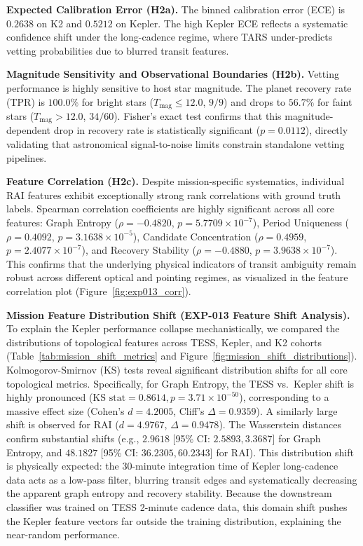 \textbf{Expected Calibration Error (H2a).} The binned calibration error (ECE) is $0.2638$ on K2 and $0.5212$ on Kepler. The high Kepler ECE reflects a systematic confidence shift under the long-cadence regime, where TARS under-predicts vetting probabilities due to blurred transit features.

\textbf{Magnitude Sensitivity and Observational Boundaries (H2b).} Vetting performance is highly sensitive to host star magnitude. The planet recovery rate (TPR) is $100.0\%$ for bright stars ($T_{\text{mag}} \le 12.0$, $9/9$) and drops to $56.7\%$ for faint stars ($T_{\text{mag}} > 12.0$, $34/60$). Fisher's exact test confirms that this magnitude-dependent drop in recovery rate is statistically significant ($p = 0.0112$), directly validating that astronomical signal-to-noise limits constrain standalone vetting pipelines.

\textbf{Feature Correlation (H2c).} Despite mission-specific systematics, individual RAI features exhibit exceptionally strong rank correlations with ground truth labels. Spearman correlation coefficients are highly significant across all core features: Graph Entropy ($\rho = -0.4820$, $p = 5.7709 \times 10^{-7}$), Period Uniqueness ($\rho = 0.4092$, $p = 3.1638 \times 10^{-5}$), Candidate Concentration ($\rho = 0.4959$, $p = 2.4077 \times 10^{-7}$), and Recovery Stability ($\rho = -0.4880$, $p = 3.9638 \times 10^{-7}$). This confirms that the underlying physical indicators of transit ambiguity remain robust across different optical and pointing regimes, as visualized in the feature correlation plot (Figure~\ref{fig:exp013_corr}).

\textbf{Mission Feature Distribution Shift (EXP-013 Feature Shift Analysis).} 
To explain the Kepler performance collapse mechanistically, we compared the distributions of topological features across TESS, Kepler, and K2 cohorts (Table~\ref{tab:mission_shift_metrics} and Figure~\ref{fig:mission_shift_distributions}). Kolmogorov-Smirnov (KS) tests reveal significant distribution shifts for all core topological metrics. Specifically, for Graph Entropy, the TESS vs.~Kepler shift is highly pronounced ($\text{KS stat} = 0.8614, p = 3.71 \times 10^{-50}$), corresponding to a massive effect size (Cohen's $d = 4.2005$, Cliff's $\Delta = 0.9359$). A similarly large shift is observed for RAI ($d = 4.9767$, $\Delta = 0.9478$). The Wasserstein distances confirm substantial shifts (e.g., $2.9618$ [95\% CI: $2.5893, 3.3687$] for Graph Entropy, and $48.1827$ [95\% CI: $36.2305, 60.2343$] for RAI). This distribution shift is physically expected: the 30-minute integration time of Kepler long-cadence data acts as a low-pass filter, blurring transit edges and systematically decreasing the apparent graph entropy and recovery stability. Because the downstream classifier was trained on TESS 2-minute cadence data, this domain shift pushes the Kepler feature vectors far outside the training distribution, explaining the near-random performance.

